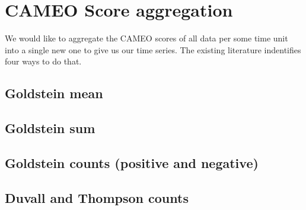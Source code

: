 \documentclass[11pt]{article}
\begin{document}
\section{CAMEO Score aggregation}
\label{sec-3}
  We would like to aggregate the CAMEO scores of all data per some time unit into a single 
new one to give us our time series. The existing literature indentifies four ways to do that.
\subsection{Goldstein mean}
\label{sec-3-1}
\subsection{Goldstein sum}
\label{sec-3-2}
\subsection{Goldstein counts (positive and negative)}
\label{sec-3-3}
\subsection{Duvall and Thompson counts}
\label{sec-3-4}
\end{document}
